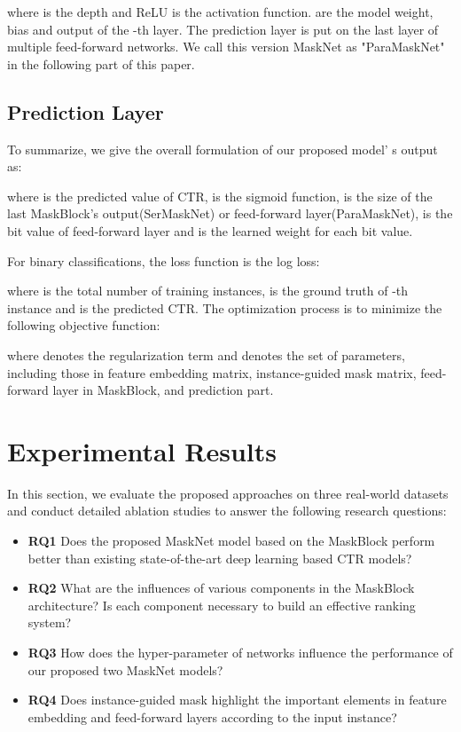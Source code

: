 \documentclass[sigconf]{acmart}
\begin{document}
where  is the depth and ReLU is the activation function.  are the model weight, bias and output of the -th layer. The prediction layer is put on the last layer of multiple feed-forward networks. We call this version MaskNet as "ParaMaskNet" in the following part of this paper.

\subsection{Prediction Layer}
To summarize, we give the overall formulation of our proposed model’ s output as:

where  is the predicted value of CTR,  is the sigmoid function,  is the size of the last MaskBlock's output(SerMaskNet) or feed-forward layer(ParaMaskNet),  is the bit value of feed-forward layer and  is the learned weight for each bit value.


For binary classifications, the loss function is the log loss:


where  is the total number of training instances,  is the ground truth of -th instance and  is the predicted CTR. The optimization process is to minimize the following objective function:


where  denotes the regularization term and  denotes the set of parameters, including those in feature embedding matrix, instance-guided mask matrix, feed-forward layer in MaskBlock, and prediction part.


\section{Experimental Results}
In this section, we evaluate the proposed approaches on three real-world datasets and conduct detailed ablation studies to answer the following research questions:

\begin{itemize}
\item\noindent\textbf{RQ1} Does the proposed MaskNet model based on the  MaskBlock perform better than existing state-of-the-art  deep learning based CTR models?
\item\noindent\textbf{RQ2} What are the influences of various components in the MaskBlock architecture? Is each component  necessary to build an effective ranking system?
\item\noindent\textbf{RQ3} How does the hyper-parameter of networks influence the performance of our proposed  two MaskNet models?
\item\noindent\textbf{RQ4} Does instance-guided mask highlight the important elements in feature embedding and feed-forward layers according to the input instance?
\end{itemize}
\end{document}
